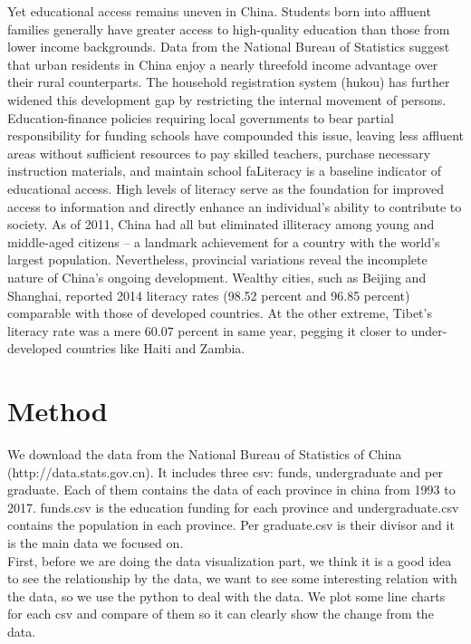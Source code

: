 \noindent Yet educational access remains uneven in China. Students born into affluent families generally have greater access to high-quality education than those from lower income backgrounds.\cite{rong2001inequality} Data from the National Bureau of Statistics suggest that urban residents in China enjoy a nearly threefold income advantage over their rural counterparts. The household registration system (hukou) has further widened this development gap by restricting the internal movement of persons.  Education-finance policies requiring local governments to bear partial responsibility for funding schools have compounded this issue, leaving less affluent areas without sufficient resources to pay skilled teachers, purchase necessary instruction materials, and maintain school faLiteracy is a baseline indicator of educational access. High levels of literacy serve as the foundation for improved access to information and directly enhance an individual’s ability to contribute to society.  As of 2011, China had all but eliminated illiteracy among young and middle-aged citizens – a landmark achievement for a country with the world’s largest population. Nevertheless, provincial variations reveal the incomplete nature of China’s ongoing development. Wealthy cities, such as Beijing and Shanghai, reported 2014 literacy rates (98.52 percent and 96.85 percent) comparable with those of developed countries.\cite{tsang1996financial} At the other extreme, Tibet’s literacy rate was a mere 60.07 percent in same year, pegging it closer to under-developed countries like Haiti and Zambia.

\section{Method}
We download the data from the National Bureau of Statistics of China (http://data.stats.gov.cn). It includes three csv: funds, undergraduate and per graduate. Each of them contains the data of each province in china from 1993 to 2017. funds.csv is the education funding for each province and undergraduate.csv contains the population in each province. Per graduate.csv is their divisor and it is the main data we focused on.\\

\noindent First, before we are doing the data visualization part, we think it is a good idea to see the relationship by the data, we want to see some interesting relation with the data, so we use the python to deal with the data. We plot some line charts for each csv and compare of them so it can clearly show the change from the data.\\

